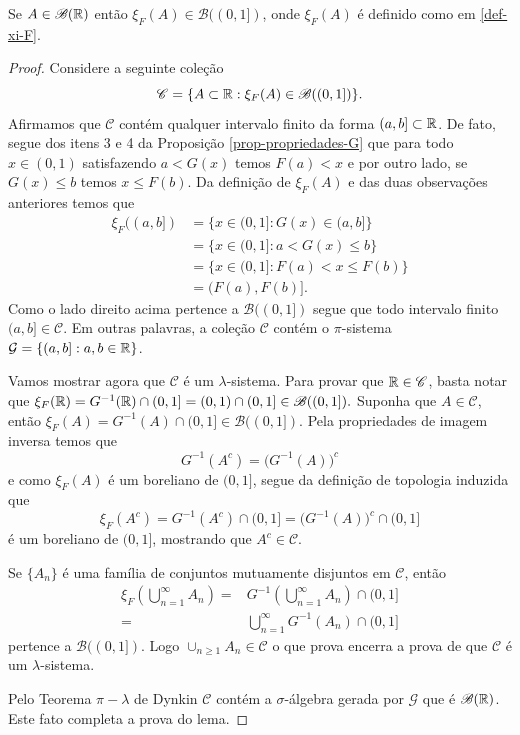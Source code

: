 \begin{lema}
	Se $A\in\mathscr{B}(\mathbb{R})$ então $\xi_F(A) \in\mathscr{B}((0,1])$, onde
	$\xi_F(A)$ é definido como em \eqref{def-xi-F}.
\end{lema}



\begin{proof}
Considere a seguinte coleção 
	\[
		\mathscr{C} 
		=
		\{ A\subset\mathbb{R}: \xi_F(A) \in \mathscr{B}((0,1])\}.
	\]
Afirmamos que $\mathscr{C}$ contém qualquer intervalo finito da forma
$(a,b]\subset \mathbb{R}$. De fato, segue dos itens 3 e 4 
da Proposição \ref{prop-propriedades-G} que 
para todo $x\in (0,1)$ satisfazendo 
$a<G(x)$ temos $F(a)<x$ e por outro lado, se $G(x)\leq b$ temos 
$x\leq F(b)$. Da definição de $\xi_{F}(A)$ e 
das duas observações anteriores temos que
%
%
\begin{align*}
	\xi_F((a,b]) 
	&= 
	\{ x\in (0,1]: G(x) \in (a,b] \}
	\\
	&=	
	\{ x\in (0,1]: a<G(x)\leq b  \}
	\\
	&=
	\{ x\in (0,1]:F(a) <x \leq F(b) \}
	\\
	&=
	(F(a),F(b)].
\end{align*}
Como o lado direito acima pertence a $\mathscr{B}((0,1])$
segue que todo intervalo finito $(a,b]\in \mathscr{C}$.
Em outras palavras, a coleção $\mathscr{C}$ 
contém o $\pi$-sistema $\mathcal{G}=\{ (a,b]: a,b\in\mathbb{R}\}$.


Vamos mostrar agora que $\mathscr{C}$ é um $\lambda$-sistema. 
Para provar que $\mathbb{R}\in \mathscr{C}$, basta 
notar que
$
	\xi_F(\mathbb{R})
	= G^{-1}(\mathbb{R})\cap (0,1] 
	= (0,1)\cap (0,1]
	\in \mathscr{B}((0,1]). 
$
Suponha que $A\in\mathscr{C}$, então 
$\xi_F(A)=G^{-1}(A)\cap (0,1]\in \mathscr{B}((0,1])$.
Pela propriedades de imagem inversa temos que 
\[
	G^{-1}(A^c)= \Big(G^{-1}(A)\Big)^c
\]
e como $\xi_F(A)$ é um boreliano de $(0,1]$, segue da definição 
de topologia induzida que 
	\[
		\xi_F(A^c)
		=
		G^{-1}(A^c)\cap (0,1]
		= 
		\Big(G^{-1}(A)\Big)^c\cap (0,1]		
	\]
é um boreliano de $(0,1]$, mostrando que $A^c\in\mathscr{C}$.

Se $\{A_n\}$ é uma família de 
conjuntos mutuamente disjuntos em $\mathscr{C}$,
então 
	\begin{align*}
	\xi_F\left( \bigcup_{n=1}^{\infty} A_n\right)
	=&
	G^{-1}\left( \bigcup_{n=1}^{\infty} A_n\right)\cap (0,1]
	\\
	=&
	\bigcup_{n=1}^{\infty} G^{-1}\left(A_n \right)\cap (0,1]
	\end{align*}
pertence a $\mathscr{B}((0,1])$. Logo $\cup_{n\geq 1} A_n\in \mathscr{C}$
o que prova encerra a prova de que $\mathscr{C}$ é um $\lambda$-sistema.

Pelo Teorema $\pi-\lambda$ de Dynkin $\mathscr{C}$ contém a $\sigma$-álgebra
gerada por $\mathcal{G}$ que é $\mathscr{B}(\mathbb{R})$. Este fato 
completa a prova do lema.
\end{proof}

